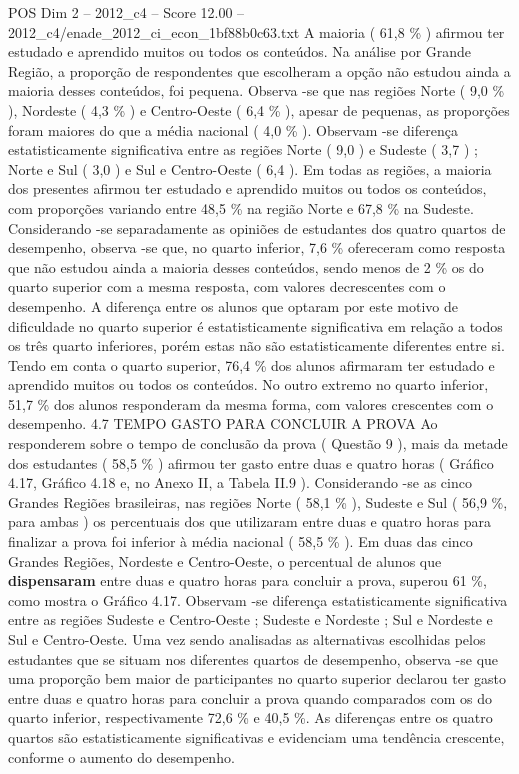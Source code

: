 \begin{textsample}{POS Dim 2 – 2012\_c4 – Score 12.00 – 2012\_c4/enade\_2012\_ci\_econ\_1bf88b0c63.txt}
A maioria ( 61,8 \% ) afirmou ter estudado e aprendido muitos ou todos os conteúdos.
Na análise por Grande Região, a proporção de respondentes que escolheram a opção não estudou ainda a maioria desses conteúdos, foi pequena.
Observa -se que nas regiões Norte ( 9,0 \% ), Nordeste ( 4,3 \% ) e Centro-Oeste ( 6,4 \% ), apesar de pequenas, as proporções foram maiores do que a média nacional ( 4,0 \% ).
Observam -se diferença estatisticamente significativa entre as regiões Norte ( 9,0 ) e Sudeste ( 3,7 ) ; Norte e Sul ( 3,0 ) e Sul e Centro-Oeste ( 6,4 ).
Em todas as regiões, a maioria dos presentes afirmou ter estudado e aprendido muitos ou todos os conteúdos, com proporções variando entre 48,5 \% na região Norte e 67,8 \% na Sudeste.
Considerando -se separadamente as opiniões de estudantes dos quatro quartos de desempenho, observa -se que, no quarto inferior, 7,6 \% ofereceram como resposta que não estudou ainda a maioria desses conteúdos, sendo menos de 2 \% os do quarto superior com a mesma resposta, com valores decrescentes com o desempenho.
A diferença entre os alunos que optaram por este motivo de dificuldade no quarto superior é estatisticamente significativa em relação a todos os três quarto inferiores, porém estas não são estatisticamente diferentes entre si.
Tendo em conta o quarto superior, 76,4 \% dos alunos afirmaram ter estudado e aprendido muitos ou todos os conteúdos.
No outro extremo no quarto inferior, 51,7 \% dos alunos responderam da mesma forma, com valores crescentes com o desempenho. 4.7 TEMPO GASTO PARA CONCLUIR A PROVA Ao responderem sobre o tempo de conclusão da prova ( Questão 9 ), mais da metade dos estudantes ( 58,5 \% ) afirmou ter gasto entre duas e quatro horas ( Gráfico 4.17, Gráfico 4.18 e, no Anexo II, a Tabela II.9 ).
Considerando -se as cinco Grandes Regiões brasileiras, nas regiões Norte ( 58,1 \% ), Sudeste e Sul ( 56,9 \%, para ambas ) os percentuais dos que utilizaram entre duas e quatro horas para finalizar a prova foi inferior à média nacional ( 58,5 \% ).
Em duas das cinco Grandes Regiões, Nordeste e Centro-Oeste, o percentual de alunos que \textbf{dispensaram} entre duas e quatro horas para concluir a prova, superou 61 \%, como mostra o Gráfico 4.17.
Observam -se diferença estatisticamente significativa entre as regiões Sudeste e Centro-Oeste ; Sudeste e Nordeste ; Sul e Nordeste e Sul e Centro-Oeste.
Uma vez sendo analisadas as alternativas escolhidas pelos estudantes que se situam nos diferentes quartos de desempenho, observa -se que uma proporção bem maior de participantes no quarto superior declarou ter gasto entre duas e quatro horas para concluir a prova quando comparados com os do quarto inferior, respectivamente 72,6 \% e 40,5 \%.
As diferenças entre os quatro quartos são estatisticamente significativas e evidenciam uma tendência crescente, conforme o aumento do desempenho.

\end{textsample}
